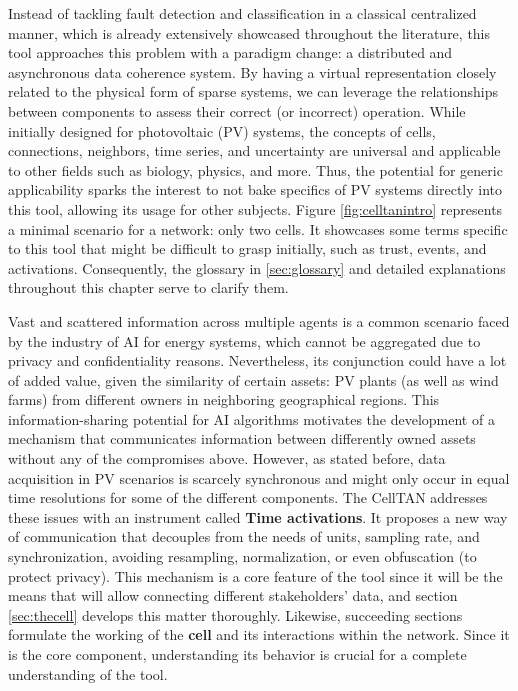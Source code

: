 Instead of tackling fault detection and classification in a classical centralized manner, which is already extensively showcased throughout the literature, this tool approaches this problem with a paradigm change: a distributed and asynchronous data coherence system. By having a virtual representation closely related to the physical form of sparse systems, we can leverage the relationships between components to assess their correct (or incorrect) operation. While initially designed for photovoltaic (PV) systems, the concepts of cells, connections, neighbors, time series, and uncertainty are universal and applicable to other fields such as biology, physics, and more. Thus, the potential for generic applicability sparks the interest to not bake specifics of PV systems directly into this tool, allowing its usage for other subjects. Figure \ref{fig:celltanintro} represents a minimal scenario for a network: only two cells. It showcases some terms specific to this tool that might be difficult to grasp initially, such as trust, events, and activations. Consequently, the glossary in \ref{sec:glossary} and detailed explanations throughout this chapter serve to clarify them.

Vast and scattered information across multiple agents is a common scenario faced by the industry of AI for energy systems, which cannot be aggregated due to privacy and confidentiality reasons. Nevertheless, its conjunction could have a lot of added value, given the similarity of certain assets: PV plants (as well as wind farms) from different owners in neighboring geographical regions. This information-sharing potential for AI algorithms motivates the development of a mechanism that communicates information between differently owned assets without any of the compromises above. However, as stated before, data acquisition in PV scenarios is scarcely synchronous and might only occur in equal time resolutions for some of the different components. The CellTAN addresses these issues with an instrument called \textbf{Time activations}. It proposes a new way of communication that decouples from the needs of units, sampling rate, and synchronization, avoiding resampling, normalization, or even obfuscation (to protect privacy). This mechanism is a core feature of the tool since it will be the means that will allow connecting different stakeholders' data, and section \ref{sec:thecell} develops this matter thoroughly. Likewise, succeeding sections formulate the working of the \textbf{cell} and its interactions within the network. Since it is the core component, understanding its behavior is crucial for a complete understanding of the tool.

